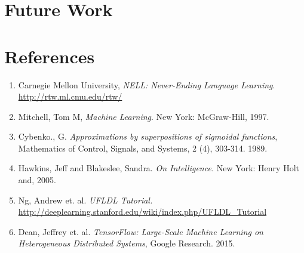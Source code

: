 \documentclass[12pt]{article}  %
\begin{document}
\section{Future Work}






\section{References}


\begin{enumerate}

\item Carnegie Mellon University, \emph{NELL: Never-Ending Language Learning}. \url{http://rtw.ml.cmu.edu/rtw/}\label{NELL}

\item Mitchell, Tom M, \emph{Machine Learning}. New York: McGraw-Hill, 1997.\label{Mitchell}

\item Cybenko., G. \emph{Approximations by superpositions of sigmoidal functions}, Mathematics of Control, Signals, and Systems, 2 (4), 303-314. 1989. \label{Cybenko}

\item Hawkins, Jeff and Blakeslee, Sandra. \emph{On Intelligence.} New York: Henry Holt and, 2005. \label{Hawkins}

\item Ng, Andrew et. al. \emph{UFLDL Tutorial.} \url{http://deeplearning.stanford.edu/wiki/index.php/UFLDL_Tutorial}\label{UFLDL}

\item Dean, Jeffrey et. al. \emph{TensorFlow: Large-Scale Machine Learning on Heterogeneous Distributed Systems}, Google Research. 2015. \label{tensorflow_paper}


\end{enumerate}
\end{document}
